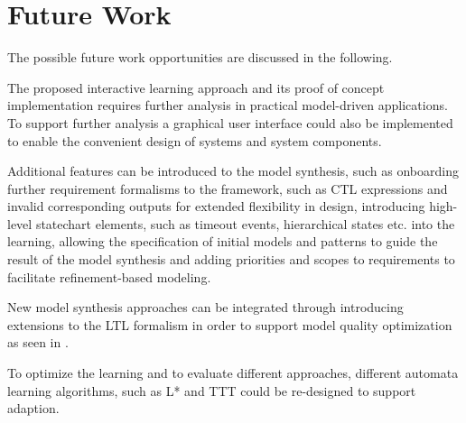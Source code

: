 \section{Future Work}
The possible future work opportunities are discussed in the following.



The proposed interactive learning approach and its proof of concept implementation requires further analysis in practical model-driven applications. To support further analysis a graphical user interface could also be implemented to enable the convenient design of systems and system components.

Additional features can be introduced to the model synthesis, such as onboarding further requirement formalisms to the framework, such as CTL expressions and invalid corresponding outputs for extended flexibility in design, introducing high-level statechart elements, such as timeout events, hierarchical states etc. into the learning, allowing the specification of initial models and patterns to guide the result of the model synthesis and adding priorities and scopes to requirements to facilitate refinement-based modeling.

New model synthesis approaches can be integrated through introducing extensions to the LTL formalism in order to support model quality optimization as seen in \cite{kupferman}.

To optimize the learning and to evaluate different approaches, different automata learning algorithms, such as L*\cite{ANGLUIN198787} and TTT\cite{10.1007/978-3-319-11164-3_26} could be re-designed to support adaption.